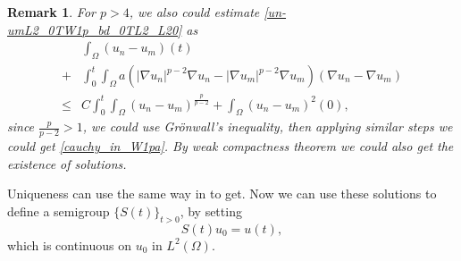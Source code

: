 \documentclass[11pt]{amsart}
\newtheorem{remark}[theorem]{Remark}
\theoremstyle{definition}
\numberwithin{equation}{section}
\newcommand*\abs[1]{\lvert#1\rvert}
\newcommand*\Brace[1]{\lbrace#1\rbrace}
\begin{document}
\begin{remark}
	For $p>4$, we also could estimate \cref{un-umL2_0TW1p_bd_0TL2_L20} as
	\begin{equation}
		\begin{split}
			& \int_{\Omega}\left( u_n-u_m \right)(t)\\
			+{} & \int_{0}^{t}\int_{\Omega}a
			\left(\abs{\nabla u_n}^{p-2}\nabla u_n
			- \abs{\nabla u_m}^{p-2}\nabla u_m\right)
			\left(\nabla u_n - \nabla u_m\right)\\
			\leq{} & C\int_0^t\int_{\Omega}
			\left( u_n-u_m \right)^{\frac{p}{p-2}}
			+ \int_{\Omega}\left( u_n-u_m \right)^2(0),
		\end{split}
	\end{equation}
	since $\frac{p}{p-2}>1$, we could use Gr\"onwall's inequality,
	then applying similar steps we could get \cref{cauchy_in_W1pa}.
	By weak compactness theorem we could also get the existence of solutions.
\end{remark}
Uniqueness can use the same way in \cite{Zhan2019Uniquenessa}
to get. Now we can use these solutions to define a semigroup $\Brace{S(t)}_{t>0}$,
by setting
\begin{equation}
	S(t)u_0 = u(t),
\end{equation}
which is continuous on $u_{0}$ in $L^2(\Omega)$.
\end{document}
